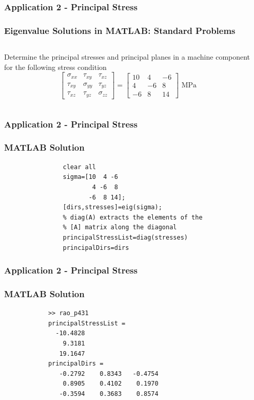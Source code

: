 \documentclass[fleqn]{beamer} %
\newcommand{\sectionIIsubsectionIVtitle}{Application 2 - Principal Stress}
\begin{document}
			\begin{frame}
				\frametitle{\sectionIIsubsectionIVtitle}
				\bigskip

				 \frametitle{Eigenvalue Solutions in MATLAB: Standard Problems}
				  \begin{columns}
				    \begin{column}{0.7\textwidth}
				      Determine the principal stresses and principal planes in a
				      machine component for the following stress condition
				      \begin{displaymath}
				        \left[ \begin{array}{ccc}
				            \sigma_{xx} & \tau_{xy} & \tau_{xz} \\
				            \tau_{xy} & \sigma_{yy} & \tau_{yz} \\
				            \tau_{xz} & \tau_{yz} & \sigma_{zz}
				          \end{array} \right] =
				        \left[ \begin{array}{rrr}
				            10 & 4 & -6 \\
				            4 & -6 & 8 \\
				            -6 & 8 & 14
				          \end{array} \right] \text{~MPa}
				      \end{displaymath}
				    \end{column}
				    \begin{column}{0.3\textwidth}
				    \end{column}
				  \end{columns}

				\btVFill 
			\end{frame}
		
			\begin{frame}[fragile]
				\frametitle{\sectionIIsubsectionIVtitle}
				\bigskip

				 \frametitle{MATLAB Solution}
				  \begin{lstlisting}
				clear all
				sigma=[10  4 -6
				        4 -6  8
				       -6  8 14];
				[dirs,stresses]=eig(sigma);
				% diag(A) extracts the elements of the
				% [A] matrix along the diagonal
				principalStressList=diag(stresses)
				principalDirs=dirs
				  \end{lstlisting}

				\btVFill 
			\end{frame}

			\begin{frame}[fragile]
				\frametitle{\sectionIIsubsectionIVtitle}
				\bigskip

				  \frametitle{MATLAB Solution}
			  \begin{lstlisting}
			>> rao_p431
			principalStressList =
			  -10.4828
			    9.3181
			   19.1647
			principalDirs =
			   -0.2792    0.8343   -0.4754
			    0.8905    0.4102    0.1970
			   -0.3594    0.3683    0.8574
			  \end{lstlisting}


				\btVFill 
			\end{frame}
\end{document}
